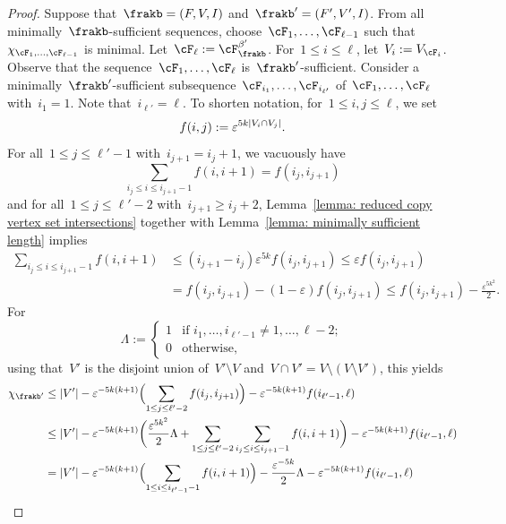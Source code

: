 \documentclass[11pt]{amsart}
\newcommand{\eps}{\varepsilon}
\DeclarePairedDelimiter{\paren}{\lparen}{\rparen}
\DeclarePairedDelimiter{\abs}{\lvert}{\rvert}
\theoremstyle{definition}
\numberwithin{equation}{section}
\begin{document}
	\begin{proof}
		Suppose that~$\frakb=(F,V,I)$ and~$\frakb'=(F',V',I)$.
		From all minimally~$\frakb$-sufficient sequences, choose~$\cF_1,\ldots,\cF_{\ell-1}$ such that~$\chi_{\cF_1,\ldots,\cF_{\ell-1}}$ is minimal.
		Let~$\cF_\ell:=\cF_{\frakb}^{\beta'}$.
		For~$1\leq i\leq \ell$, let~$V_i:=V_{\cF_i}$.
		Observe that the sequence~$\cF_1,\ldots,\cF_\ell$ is~$\frakb'$-sufficient.
		Consider a minimally~$\frakb'$-sufficient subsequence~$\cF_{i_1},\ldots,\cF_{i_{\ell'}}$ of~$\cF_1,\ldots,\cF_\ell$ with~$i_1=1$.
		Note that~$i_{\ell'}=\ell$.
		To shorten notation, for~$1\leq i,j\leq \ell$, we set
		\begin{equation*}
			f(i,j):=\eps^{5k\abs{V_{i}\cap V_{j}}}.
		\end{equation*}
		For all~$1\leq j\leq \ell'-1$ with~$i_{j+1}=i_j+1$, we vacuously have
		\begin{equation*}
			\sum_{i_j\leq i\leq i_{j+1}-1} f(i,i+1)
			=  f(i_j,i_{j+1})
		\end{equation*}
		and for all~$1\leq j\leq \ell'-2$ with~$i_{j+1}\geq i_j+2$, Lemma~\ref{lemma: reduced copy vertex set intersections} together with Lemma~\ref{lemma: minimally sufficient length} implies
		\begin{align*}
			\sum_{i_j\leq i\leq i_{j+1}-1} f(i,i+1)
			&\leq (i_{j+1}-i_j) \eps^{5k}f(i_j,i_{j+1})
			\leq \eps f(i_j,i_{j+1})\\
			&= f(i_j,i_{j+1})-(1-\eps)f(i_j,i_{j+1})
			\leq f(i_j,i_{j+1})-\frac{\eps^{5k^2}}{2}.
		\end{align*}
		For
		\begin{equation*}
			\Lambda:=\begin{cases}
				1 &\text{if~$i_1,\ldots,i_{\ell'-1}\neq 1,\ldots,\ell-2$};\\
				0 &\text{otherwise},
			\end{cases}
		\end{equation*}
		using that~$V'$ is the disjoint union of~$V'\setminus V$ and~$V\cap V'=V\setminus (V\setminus V')$, this yields
		\begin{align*}
			\chi_{\frakb'}
			&\leq\abs{V'}-\eps^{-5k(k+1)}\paren[\Big]{\sum_{1\leq j\leq \ell'-2} f(i_j,i_{j+1})}-\eps^{-5k(k+1)}f(i_{\ell'-1},\ell)\\
			&\leq \abs{V'}-\eps^{-5k(k+1)}\paren[\bigg]{\frac{\eps^{5k^2}}{2}\Lambda+\sum_{1\leq j\leq \ell'-2}\sum_{i_j\leq i\leq i_{j+1}-1} f(i,i+1)}-\eps^{-5k(k+1)}f(i_{\ell'-1},\ell)\\
			&= \abs{V'}-\eps^{-5k(k+1)}\paren[\Big]{\sum_{1\leq i\leq i_{\ell'-1}-1} f(i,i+1)}-\frac{\eps^{-5k}}{2}\Lambda-\eps^{-5k(k+1)}f(i_{\ell'-1},\ell)\\

\end{align*}
\end{proof}
\end{document}

